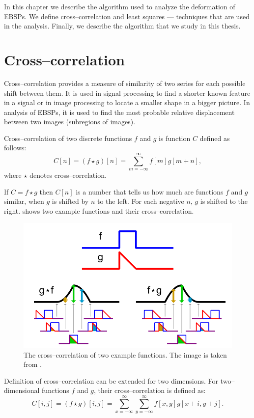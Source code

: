 In this chapter we describe the algorithm used to analyze the deformation of EBSPs. We define cross--correlation and least squares --- techniques that are used in the analysis. Finally, we describe the algorithm that we study in this thesis.

\section{Cross--correlation}
\label{cross-corr-def}
Cross--correlation provides a measure of similarity of two series for each possible shift between them. It is used in signal processing to find a shorter known feature in a signal or in image processing to locate a smaller shape in a bigger picture. In analysis of EBSPs, it is used to find the most probable relative displacement between two images (subregions of images).

Cross--correlation of two discrete functions $f$ and $g$ is function $C$ defined as follows:
\[
C[n] = (f \star g)[n] = \sum_{m=-\infty}^{\infty}f[m]g[m+n],
\]
where $\star$ denotes cross--correlation.

If $C = f \star g$ then $C[n]$ is a number that tells us how much are functions $f$ and $g$ similar, when $g$ is shifted by $n$ to the left. For each negative $n$, $g$ is shifted to the right.  shows two example functions and their cross--correlation.

\begin{figure}
	\centering
	\includegraphics[width=0.7\linewidth]{img/correlation}
	\caption{The cross--correlation of two example functions. The image is taken from \cite{correlation_example}.}
	\label{correlation-example}
\end{figure}

Definition of cross--correlation can be extended for two dimensions. For two--dimensional functions $f$ and $g$, their cross--correlation is defined as:
\[
C[i,j] = (f \star g)[i,j] = \sum_{x=-\infty}^{\infty}\sum_{y=-\infty}^{\infty}f[x,y]g[x+i,y+j].
\]

